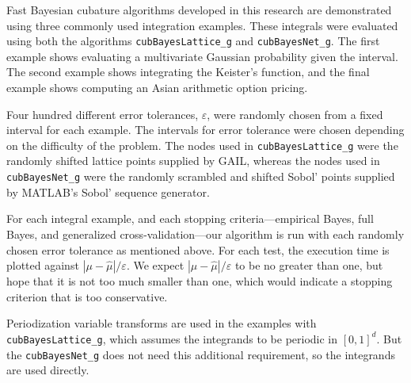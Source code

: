 \documentclass{iitthesis}          %
\newcommand{\hmu}{\widehat{\mu}}
\newcommand{\code}[1]{\texttt{#1}}
\def\abs#1{\ensuremath{\left \lvert #1 \right \rvert}}
\newcommand\secref{Section~\ref}
\newcommand{\JRNote}[1]{}
\begin{document}
\JRNote{use uniformly randomly chosen $\varepsilon$ instead 4 fixed}

Fast Bayesian cubature algorithms developed in this research are demonstrated using three commonly used integration examples.
These integrals were evaluated using both the algorithms \code{cubBayesLattice\_g} and \code{cubBayesNet\_g}. The first example shows evaluating a multivariate Gaussian probability given the interval. The second example shows integrating the Keister's function, and the final example shows computing an Asian arithmetic option pricing.  

\label{sec:numerical_experiments_cubBayesLattice}

Four hundred different error tolerances, $\varepsilon$, were randomly chosen from a fixed interval  for each example. 
The intervals for error tolerance were chosen depending on the difficulty of the problem.
The nodes used in \allowbreak \code{cubBayesLattice\_g} were the randomly shifted lattice points supplied by GAIL, whereas the nodes used in \code{cubBayesNet\_g} were the randomly scrambled and shifted Sobol' points supplied by MATLAB's Sobol' sequence generator. 

For each integral example, and each stopping criteria---empirical Bayes, full Bayes, and generalized cross-validation---our algorithm is run with each randomly chosen error tolerance as mentioned above.  For each test, the execution time is plotted against $\abs{\mu - \hmu}/\varepsilon$.  We expect $\abs{\mu - \hmu}/\varepsilon$ to be no greater than one, but hope that it is not too much smaller than one, which would indicate a stopping criterion that is too conservative.


Periodization variable transforms are used in the examples with \\ \allowbreak \code{cubBayesLattice\_g}, which assumes the integrands to be periodic in $[0,1]^d$. But the \allowbreak \code{cubBayesNet\_g} does not need this additional requirement, so the integrands are used directly.

\end{document}
